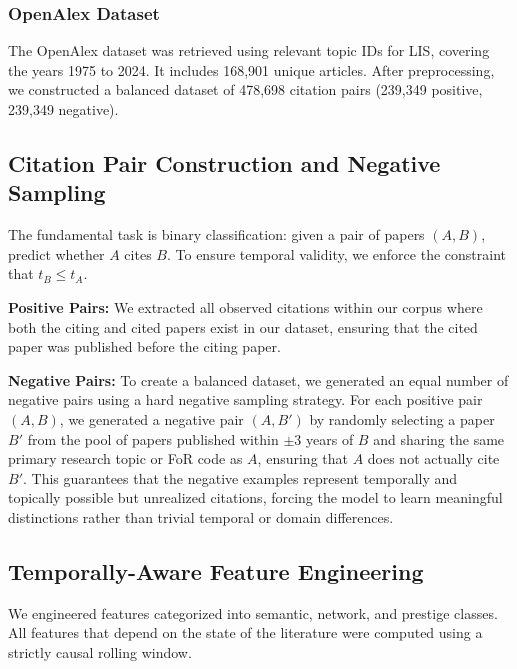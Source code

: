 \documentclass[12pt,a4paper]{article}
\begin{document}
\subsubsection{OpenAlex Dataset}
The OpenAlex dataset was retrieved using relevant topic IDs for LIS, covering the years 1975 to 2024. It includes 168,901 unique articles. After preprocessing, we constructed a balanced dataset of 478,698 citation pairs (239,349 positive, 239,349 negative).

\subsection{Citation Pair Construction and Negative Sampling}
The fundamental task is binary classification: given a pair of papers $(A, B)$, predict whether $A$ cites $B$. To ensure temporal validity, we enforce the constraint that $t_B \le t_A$.

\textbf{Positive Pairs:} We extracted all observed citations within our corpus where both the citing and cited papers exist in our dataset, ensuring that the cited paper was published before the citing paper.

\textbf{Negative Pairs:} To create a balanced dataset, we generated an equal number of negative pairs using a hard negative sampling strategy. For each positive pair $(A, B)$, we generated a negative pair $(A, B')$ by randomly selecting a paper $B'$ from the pool of papers published within $\pm 3$ years of $B$ and sharing the same primary research topic or FoR code as $A$, ensuring that $A$ does not actually cite $B'$. This guarantees that the negative examples represent temporally and topically possible but unrealized citations, forcing the model to learn meaningful distinctions rather than trivial temporal or domain differences.

\subsection{Temporally-Aware Feature Engineering}
We engineered features categorized into semantic, network, and prestige classes. All features that depend on the state of the literature were computed using a strictly causal rolling window.
\end{document}
